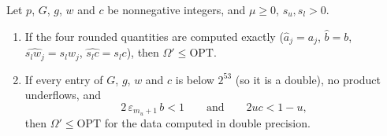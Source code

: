 \begin{theorem}\label{thm:mkip-omega}
Let $p$, $G$, $g$, $w$ and $c$ be nonnegative integers, and $\mu\ge 0$,
$s_u,s_l>0$.
\begin{enumerate}
\item[(a)] If the four rounded quantities are computed exactly
($\hat a_j=a_j$, $\hat b=b$, $\widehat{s_lw_j}=s_lw_j$, $\widehat{s_lc}=s_lc$), then
$\Omega'\le\mathrm{OPT}$.
\item[(b)] If every entry of $G$, $g$, $w$ and $c$ is below $2^{53}$ (so it
is a double), no product underflows, and
\[
  2\,\varepsilon_{m_u+1}\,b<1\qquad\text{and}\qquad 2uc<1-u,
\]
then $\Omega'\le\mathrm{OPT}$ for the data computed in double precision.
\end{enumerate}
\end{theorem}
